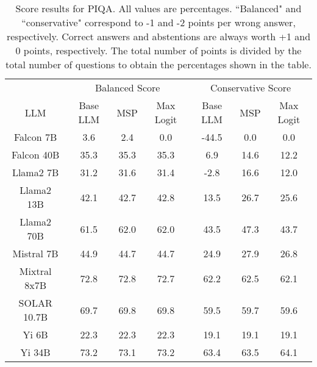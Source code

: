 \begin{table*}
\centering
\begin{tabular}{c|c|c|c|c|c|c}
& \multicolumn{3}{c|}{Balanced Score} & \multicolumn{3}{c}{Conservative Score} \\ 
LLM & Base LLM & MSP & Max Logit & Base LLM & MSP & Max Logit\\ \hline
Falcon 7B & 3.6 & 2.4 & 0.0 & -44.5 & 0.0 & 0.0\\
Falcon 40B & 35.3 & 35.3 & 35.3 & 6.9 & 14.6 & 12.2\\
Llama2 7B & 31.2 & 31.6 & 31.4 & -2.8 & 16.6 & 12.0\\
Llama2 13B & 42.1 & 42.7 & 42.8 & 13.5 & 26.7 & 25.6\\
Llama2 70B & 61.5 & 62.0 & 62.0 & 43.5 & 47.3 & 43.7\\
Mistral 7B & 44.9 & 44.7 & 44.7 & 24.9 & 27.9 & 26.8\\
Mixtral 8x7B & 72.8 & 72.8 & 72.7 & 62.2 & 62.5 & 62.1\\
SOLAR 10.7B & 69.7 & 69.8 & 69.8 & 59.5 & 59.7 & 59.6\\
Yi 6B & 22.3 & 22.3 & 22.3 & 19.1 & 19.1 & 19.1\\
Yi 34B & 73.2 & 73.1 & 73.2 & 63.4 & 63.5 & 64.1\\
\hline
\end{tabular}
\caption{Score results for PIQA. All values are percentages. ``Balanced" and ``conservative" correspond to -1 and -2 points per wrong answer, respectively. Correct answers and abstentions are always worth +1 and 0 points, respectively. The total number of points is divided by the total number of questions to obtain the percentages shown in the table.}
\label{tab:piqa_score}
\end{table*}
